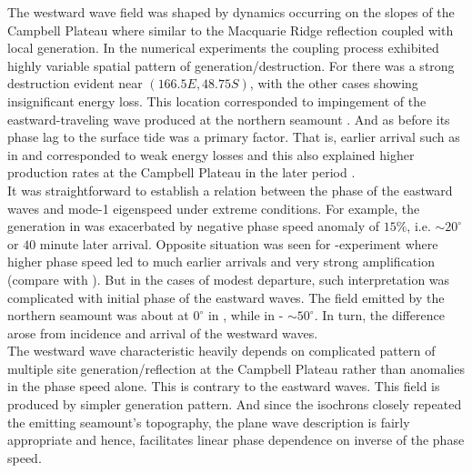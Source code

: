 \documentclass[12pt]{article}
\begin{document}
The westward wave field was shaped by dynamics occurring on the slopes of the Campbell 
Plateau where similar to the Macquarie Ridge reflection coupled with local generation. In the 
numerical experiments the coupling process exhibited highly variable spatial pattern of 
generation/destruction. For  there was a strong destruction evident near $(166.5E, 
48.75S)$,  with the other cases showing insignificant energy loss. 
This 
location corresponded to impingement of the eastward-traveling wave produced at the northern 
seamount . And as before its phase lag to the surface  
tide 
was a primary factor. That is, earlier arrival such as in  and  
corresponded to weak energy losses and this also explained higher production rates at the 
Campbell 
Plateau in the later period .\\

It was straightforward to establish a relation between the phase of the eastward waves and mode-1 
eigenspeed under extreme conditions. For example, the generation in  was   
exacerbated by negative phase speed anomaly of $15\%$, i.e. $\sim 20^{\circ}$ or 
$40$ minute later arrival. Opposite situation was seen for -experiment where higher 
phase speed led to much earlier arrivals and very strong amplification (compare 
 with ). But in the 
cases of modest departure, such interpretation was complicated with initial phase of the 
eastward waves. The field emitted by the northern seamount was about at $0^{\circ}$ in 
, while in  - $\sim 50^{\circ}$. In turn, the difference 
arose from incidence and arrival of the westward waves.\\

The westward wave characteristic heavily depends on complicated pattern of multiple site 
generation/reflection at the Campbell Plateau rather than anomalies in the phase speed alone. This 
is contrary to the eastward waves. This field is produced by simpler generation pattern. And 
since the isochrons closely repeated the emitting seamount's topography, the plane wave description 
is fairly appropriate and hence, facilitates linear phase dependence on inverse of the phase 
speed.\\
\end{document}
